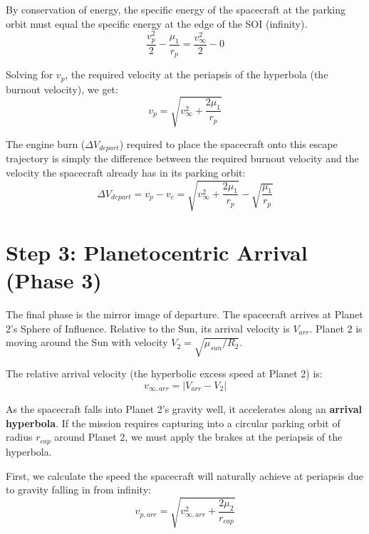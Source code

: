 \documentclass[12pt]{article}
\begin{document}
By conservation of energy, the specific energy of the spacecraft at the parking orbit must equal the specific energy at the edge of the SOI (infinity). 
\begin{equation}
    \frac{v_p^2}{2} - \frac{\mu_1}{r_p} = \frac{v_{\infty}^2}{2} - 0
\end{equation}

Solving for $v_p$, the required velocity at the periapsis of the hyperbola (the burnout velocity), we get:
\begin{equation}
    v_p = \sqrt{v_{\infty}^2 + \frac{2\mu_1}{r_p}}
\end{equation}

The engine burn ($\Delta V_{depart}$) required to place the spacecraft onto this escape trajectory is simply the difference between the required burnout velocity and the velocity the spacecraft already has in its parking orbit:
\begin{equation}
    \Delta V_{depart} = v_p - v_c = \sqrt{v_{\infty}^2 + \frac{2\mu_1}{r_p}} - \sqrt{\frac{\mu_1}{r_p}}
\end{equation}


\section*{Step 3: Planetocentric Arrival (Phase 3)}
The final phase is the mirror image of departure. The spacecraft arrives at Planet 2's Sphere of Influence. Relative to the Sun, its arrival velocity is $V_{arr}$. Planet 2 is moving around the Sun with velocity $V_2 = \sqrt{\mu_{sun}/R_2}$. 

The relative arrival velocity (the hyperbolic excess speed at Planet 2) is:
\begin{equation}
    v_{\infty, arr} = | V_{arr} - V_2 |
\end{equation}

As the spacecraft falls into Planet 2's gravity well, it accelerates along an \textbf{arrival hyperbola}. If the mission requires capturing into a circular parking orbit of radius $r_{cap}$ around Planet 2, we must apply the brakes at the periapsis of the hyperbola. 

First, we calculate the speed the spacecraft will naturally achieve at periapsis due to gravity falling in from infinity:
\begin{equation}
    v_{p, arr} = \sqrt{v_{\infty, arr}^2 + \frac{2\mu_2}{r_{cap}}}
\end{equation}
\end{document}
